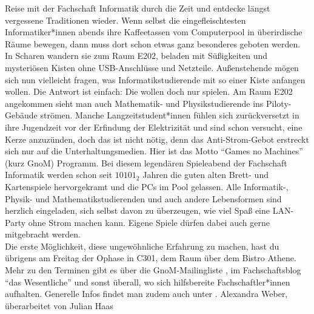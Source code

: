 {Reise mit der Fachschaft Informatik durch die Zeit und entdecke längst vergessene Traditionen wieder.
}{
Wenn selbst die eingefleischtesten Informatiker*innen abends ihre Kaffeetassen vom Computerpool in überirdische Räume bewegen, dann muss dort schon etwas ganz besonderes geboten werden. In Scharen wandern sie zum Raum E202, beladen mit Süßigkeiten und mysteriösen Kisten ohne USB-Anschlüsse und Netzteile. Außenstehende mögen sich nun vielleicht fragen, was Informatikstudierende mit so einer Kiste anfangen wollen. Die Antwort ist einfach: Die wollen doch nur spielen.
Am Raum E202 angekommen sieht man auch Mathematik- und Physikstudierende ins Piloty-Gebäude strömen. Manche Langzeitstudent*innen fühlen sich zurückversetzt in ihre Jugendzeit vor der Erfindung der Elektrizität und sind schon versucht, eine Kerze anzuzünden, doch das ist nicht nötig, denn das Anti-Strom-Gebot erstreckt sich nur auf die Unterhaltungsmedien. Hier ist das Motto "`Games no Machines"' (kurz GnoM) Programm.
Bei diesem legendären Spieleabend der Fachschaft Informatik werden schon seit $10101_2$ Jahren die guten alten Brett- und Kartenspiele hervorgekramt und die PCs im Pool gelassen.
Alle Informatik-, Physik- und Mathematikstudierenden und auch andere Lebensformen sind herzlich eingeladen, sich selbst davon zu überzeugen, wie viel Spaß eine LAN-Party ohne Strom machen kann. Eigene Spiele dürfen dabei auch gerne mitgebracht werden.\\
Die erste Möglichkeit, diese ungewöhnliche Erfahrung zu machen, hast du übrigens am Freitag der Ophase in C301, dem Raum über dem Bistro Athene.\\
Mehr zu den Terminen gibt es über die GnoM-Mailingliste \footnotemark[1], im Fachschaftsblog "`das Wesentliche"' \footnotemark[2] und sonst überall, wo sich hilfsbereite Fachschaftler*innen aufhalten. Generelle Infos findet man zudem auch unter \footnotemark[3].
}
{Alexandra Weber,\\
überarbeitet von Julian Haas}


\vfill
{}
\newpage

